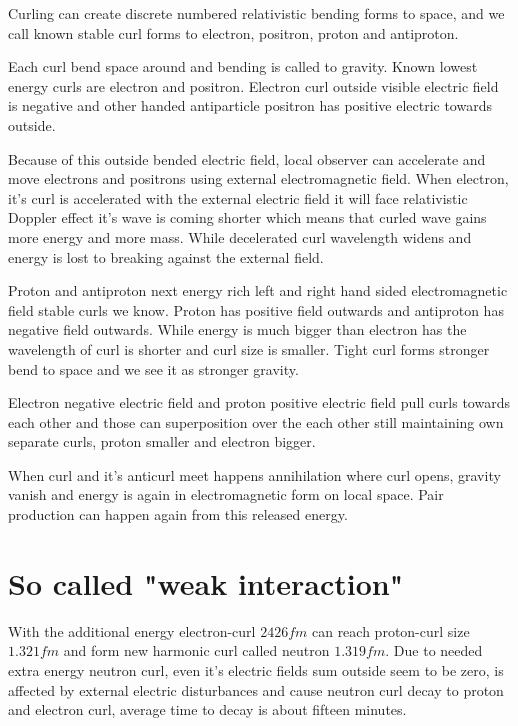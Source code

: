 Curling can create discrete numbered relativistic bending forms to space, and
we call known stable curl forms to electron, positron, proton and antiproton.

Each curl bend space around and bending is called to gravity. Known lowest
energy curls are electron and positron. Electron curl outside visible electric
field is negative and other handed antiparticle positron has positive electric
towards outside.

Because of this outside bended electric field, local observer can accelerate
and move electrons and positrons using external electromagnetic field. When
electron, it's curl is accelerated with the external electric field it will
face relativistic Doppler effect it's wave is coming shorter which means that
curled wave gains more energy and more mass. While decelerated curl wavelength
widens and energy is lost to breaking against the external field.

Proton and antiproton next energy rich left and right hand sided
electromagnetic field stable curls we know. Proton has positive field outwards
and antiproton has negative field outwards. While energy is much bigger than
electron has the wavelength of curl is shorter and curl size is smaller. Tight
curl forms stronger bend to space and we see it as stronger gravity.

Electron negative electric field and proton positive electric field pull curls
towards each other and those can superposition over the each other still
maintaining own separate curls, proton smaller and electron bigger. %

When curl and it's anticurl meet happens annihilation\cite{Annihilation} where
curl opens, gravity vanish and energy is again in electromagnetic form on
local space. Pair production\cite{PairProduction} can happen again from this
released energy.

\section{So called "weak interaction"}
\label{weak_interaction}

With the additional energy electron-curl $2426fm$\cite{ComptonWavelength}
can reach proton-curl size $1.321fm$ and form new harmonic curl called neutron
$1.319fm$. Due to needed extra energy neutron curl, even it's electric fields
sum outside seem to be zero, is affected by external electric disturbances and
cause neutron curl decay to proton and electron curl, average time to decay is
about fifteen minutes.

